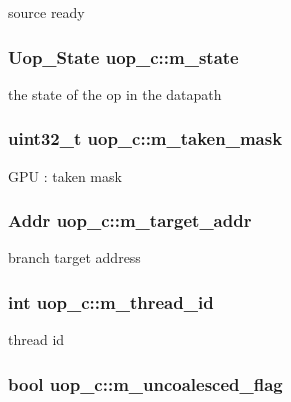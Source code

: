 \label{classuop__c_a17902cc0c1b6822c2b2ae90c1dfb68d8}
source ready \hypertarget{classuop__c_a5a06fb116a11e460c6e4fe8911ea313e}{
\subsubsection[{m\_\-state}]{\setlength{\rightskip}{0pt plus 5cm}Uop\_\-State {\bf uop\_\-c::m\_\-state}}}
\label{classuop__c_a5a06fb116a11e460c6e4fe8911ea313e}
the state of the op in the datapath \hypertarget{classuop__c_a09c150848bd478757885a3cdaad467f4}{
\subsubsection[{m\_\-taken\_\-mask}]{\setlength{\rightskip}{0pt plus 5cm}uint32\_\-t {\bf uop\_\-c::m\_\-taken\_\-mask}}}
\label{classuop__c_a09c150848bd478757885a3cdaad467f4}
GPU : taken mask \hypertarget{classuop__c_a60944607488a0ad1e06be21d4e028e26}{
\subsubsection[{m\_\-target\_\-addr}]{\setlength{\rightskip}{0pt plus 5cm}Addr {\bf uop\_\-c::m\_\-target\_\-addr}}}
\label{classuop__c_a60944607488a0ad1e06be21d4e028e26}
branch target address \hypertarget{classuop__c_a1be8c8d4660a12852650f4d8f2d4664b}{
\subsubsection[{m\_\-thread\_\-id}]{\setlength{\rightskip}{0pt plus 5cm}int {\bf uop\_\-c::m\_\-thread\_\-id}}}
\label{classuop__c_a1be8c8d4660a12852650f4d8f2d4664b}
thread id \hypertarget{classuop__c_aa2aef7fac1040ff057b6e77867957072}{
\subsubsection[{m\_\-uncoalesced\_\-flag}]{\setlength{\rightskip}{0pt plus 5cm}bool {\bf uop\_\-c::m\_\-uncoalesced\_\-flag}}}
